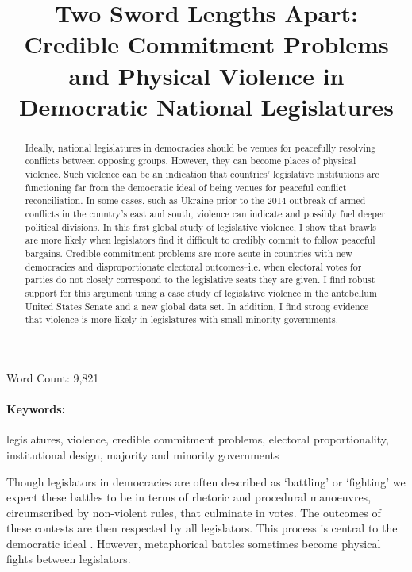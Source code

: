 \documentclass[a4paper]{article}\usepackage[]{graphicx}\usepackage[]{color}
\title{Two Sword Lengths Apart: Credible Commitment Problems and Physical Violence in Democratic National Legislatures}
\begin{document}
\maketitle

\begin{center}
Word Count: 9,821
\end{center}

\begin{abstract}
Ideally, national legislatures in democracies should be venues for peacefully resolving conflicts between opposing groups. However, they can become places of physical violence. Such violence can be an indication that countries' legislative institutions are functioning far from the democratic ideal of being venues for peaceful conflict reconciliation. In some cases, such as Ukraine prior to the 2014 outbreak of armed conflicts in the country's east and south, violence can indicate and possibly fuel deeper political divisions. In this first global study of legislative violence, I show that brawls are more likely when legislators find it difficult to credibly commit to follow peaceful bargains. Credible commitment problems are more acute in countries with new democracies and disproportionate electoral outcomes--i.e. when electoral votes for parties do not closely correspond to the legislative seats they are given. I find robust support for this argument using a case study of legislative violence in the antebellum United States Senate and a new global data set. In addition, I find strong evidence that violence is more likely in legislatures with small minority governments.
\end{abstract}


\paragraph{Keywords:} legislatures, violence, credible commitment problems, electoral proportionality, institutional design, majority and minority governments

\vspace{0.3cm}


Though legislators in democracies are often described as `battling' or `fighting' we expect these battles to be in terms of rhetoric and procedural manoeuvres, circumscribed by non-violent rules, that culminate in votes. The outcomes of these contests are then respected by all legislators. This process is central to the democratic ideal  \cite[220]{Schwarzmantel2010}. However, metaphorical battles sometimes become physical fights between legislators.
\end{document}
